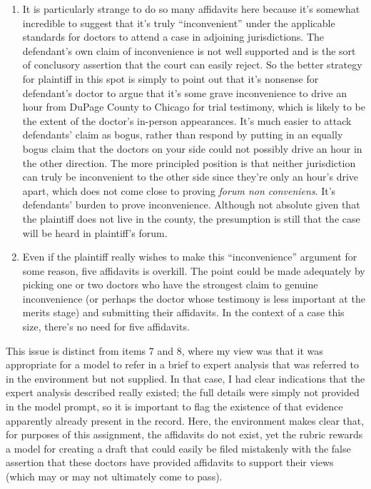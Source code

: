\documentclass[11pt]{article}
\begin{document}
\begin{enumerate}
\item It is particularly strange to do so many affidavits here because it's somewhat incredible to suggest that it's truly ``inconvenient'' under the applicable standards for doctors to attend a case in adjoining jurisdictions. The defendant's own claim of inconvenience is not well supported and is the sort of conclusory assertion that the court can easily reject. So the better strategy for plaintiff in this spot is simply to point out that it's nonsense for defendant's doctor to argue that it's some grave inconvenience to drive an hour from DuPage County to Chicago for trial testimony, which is likely to be the extent of the doctor's in-person appearances. It's much easier to attack defendants' claim as bogus, rather than respond by putting in an equally bogus claim that the doctors on your side could not possibly drive an hour in the other direction. The more principled position is that neither jurisdiction can truly be inconvenient to the other side since they're only an hour's drive apart, which does not come close to proving \emph{forum non conveniens}. It's defendants' burden to prove inconvenience. Although not absolute given that the plaintiff does not live in the county, the presumption is still that the case will be heard in plaintiff's forum.
\item Even if the plaintiff really wishes to make this ``inconvenience'' argument for some reason, five affidavits is overkill. The point could be made adequately by picking one or two doctors who have the strongest claim to genuine inconvenience (or perhaps the doctor whose testimony is less important at the merits stage) and submitting their affidavits. In the context of a case this size, there's no need for five affidavits.
\end{enumerate}

This issue is distinct from items 7 and 8, where my view was that it was appropriate for a model to refer in a brief to expert analysis that was referred to in the environment but not supplied. In that case, I had clear indications that the expert analysis described really existed; the full details were simply not provided in the model prompt, so it is important to flag the existence of that evidence apparently already present in the record. Here, the environment makes clear that, for purposes of this assignment, the affidavits do not exist, yet the rubric rewards a model for creating a draft that could easily be filed mistakenly with the false assertion that these doctors have provided affidavits to support their views (which may or may not ultimately come to pass).
\end{document}
